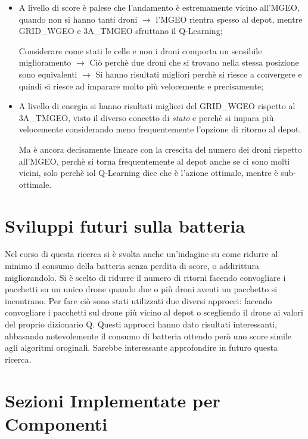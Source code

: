 \documentclass[12pt]{article}
\begin{document}
\begin{itemize}

    \item A livello di score è palese che l'andamento è estremamente vicino all'MGEO, quando non si hanno tanti droni $\rightarrow$ l'MGEO rientra spesso al depot, mentre GRID\_WGEO e 3A\_TMGEO sfruttano il Q-Learning; 
    
    Considerare come stati le celle e non i droni comporta un sensibile miglioramento $\rightarrow$ Ciò perchè due droni che si trovano nella stessa posizione sono equivalenti $\rightarrow$ Si hanno risultati migliori perchè si riesce a convergere e quindi si riesce ad imparare molto più velocemente e precisamente;
    
    \item A livello di energia si hanno risultati migliori del GRID\_WGEO rispetto al 3A\_TMGEO, visto il diverso concetto di \textit{stato} e perchè si impara più velocemente considerando meno frequentemente l'opzione di ritorno al depot.
    
    Ma è ancora decisamente lineare con la crescita del numero dei droni rispetto all'MGEO, perchè si torna frequentemente al depot anche se ci sono molti vicini, solo perchè iol Q-Learning dice che è l'azione ottimale, mentre è sub-ottimale.

\end{itemize}


\section{Sviluppi futuri sulla batteria}

Nel corso di questa ricerca si è svolta anche un'indagine su come ridurre al minimo il consumo della batteria senza perdita di score, o addirittura migliorandolo.
Si è scelto di ridurre il numero di ritorni facendo convogliare i pacchetti su un unico drone quando due o più droni aventi un pacchetto si incontrano. Per fare ciò sono stati utilizzati due diversi approcci: facendo convogliare i pacchetti sul drone più vicino al depot o scegliendo il drone ai valori del proprio dizionario Q.
Questi approcci hanno dato risultati interessanti, abbasando notevolemente il consumo di batteria ottendo però uno score simile agli algoritmi oroginali. Sarebbe interessante approfondire in futuro questa ricerca.


\section{Sezioni Implementate per Componenti}
\end{document}
